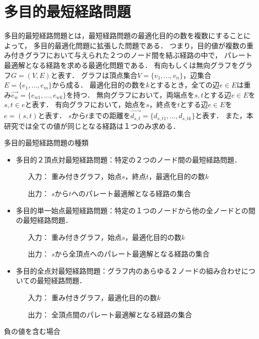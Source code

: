 \documentclass[12pt]{optlab-bachelor}
\begin{document}
\section{多目的最短経路問題}
多目的最短経路問題とは，最短経路問題の最適化目的の数を複数にすることによって，
多目的最適化問題に拡張した問題である．
つまり，目的値が複数の重み付きグラフにおいて与えられた２つのノード間を結ぶ経路の中で，
パレート最適解となる経路を求める最適化問題である．
有向もしくは無向グラフをグラフ$G=(V,E)$と表す．
グラフは頂点集合$V=\{v_1,\ldots,v_n\}$，辺集合$E=\{e_1,\ldots,e_m\}$から成る．
最適化目的の数を$k$とするとき，全ての辺$e\in E$は重み$\vec{e_w} = \{e_{w1},\ldots,e_{wk}\}$を持つ．
無向グラフにおいて，両端点を$s,t$とする辺$e \in E$を$s,t \in e$と表す．
有向グラフにおいて，始点を$s$，終点を$t$とする辺$e \in E$を$e=(s,t)$と表す．
$s$から$t$までの距離を$\vec{d_{s,t}} = \{d_{s,t1},\ldots,d_{s,tk}\}$と表す．
また，本研究では全ての値が同じとなる経路は１つのみ求める．
\begin{description}
  \item[多目的最短経路問題の種類]
\end{description}
\begin{itemize}
\item 多目的２頂点対最短経路問題：特定の２つのノード間の最短経路問題．
  \begin{itemize}
    \item[入力：]重み付きグラフ，始点$s$，終点$t$，最適化目的の数$k$
    \item[出力：]$s$から$t$へのパレート最適解となる経路の集合
  \end{itemize}
  \item 多目的単一始点最短経路問題：特定の１つのノードから他の全ノードとの間の最短経路問題．
  \begin{itemize}
    \item[入力：]重み付きグラフ，始点$s$，最適化目的の数$k$
    \item[出力：]$s$から全頂点へのパレート最適解となる経路の集合
  \end{itemize}
  \item 多目的全点対最短経路問題：グラフ内のあらゆる２ノードの組み合わせについての最短経路問題．
  \begin{itemize}
    \item[入力：]重み付きグラフ，最適化目的の数$k$
    \item[出力：]全頂点間のパレート最適解となる経路の集合
  \end{itemize}
\end{itemize}
\begin{description}
  \item[負の値を含む場合]
\end{description}
\end{document}
